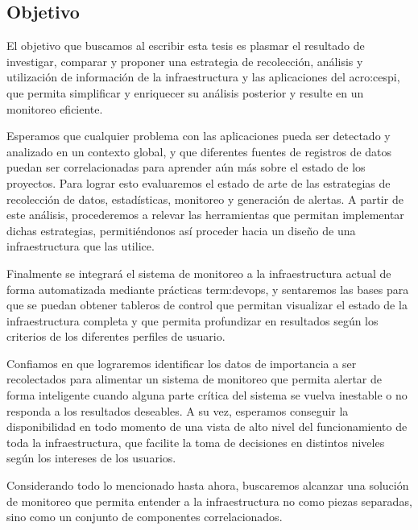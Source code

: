 \subsection{Objetivo}
\label{objetivo}

El objetivo que buscamos al escribir esta tesis es plasmar el resultado de
investigar, comparar y proponer una estrategia de recolección, análisis y
utilización de información de la infraestructura y las aplicaciones del
\gls{acro:cespi}, que permita simplificar y enriquecer su análisis posterior y
resulte en un monitoreo eficiente.

Esperamos que cualquier problema con las aplicaciones pueda ser detectado y
analizado en un contexto global, y que diferentes fuentes de registros de datos
puedan ser correlacionadas para aprender aún más sobre el estado de los
proyectos. Para lograr esto evaluaremos el estado de arte de las estrategias
de recolección de datos, estadísticas, monitoreo y generación de alertas.
A partir de este análisis, procederemos a relevar las
herramientas que permitan implementar dichas estrategias, permitiéndonos así
proceder hacia un diseño de una infraestructura que las utilice.

Finalmente se integrará el sistema de monitoreo a la infraestructura actual de
forma automatizada mediante prácticas \gls{term:devops}, y sentaremos las bases
para que se puedan obtener tableros de control que permitan visualizar el estado
de la infraestructura completa y que permita profundizar en resultados según los
criterios de los diferentes perfiles de usuario.

Confiamos en que lograremos identificar los datos de importancia a ser
recolectados para alimentar un sistema de monitoreo que permita alertar de
forma inteligente cuando alguna parte crítica del sistema se vuelva inestable o
no responda a los resultados deseables. A su vez, esperamos conseguir la
disponibilidad en todo momento de una vista de alto nivel del funcionamiento de
toda la infraestructura, que facilite la toma de decisiones en distintos
niveles según los intereses de los usuarios.

Considerando todo lo mencionado hasta ahora, buscaremos alcanzar una solución
de monitoreo que permita entender a la infraestructura no como piezas
separadas, sino como un conjunto de componentes correlacionados.
